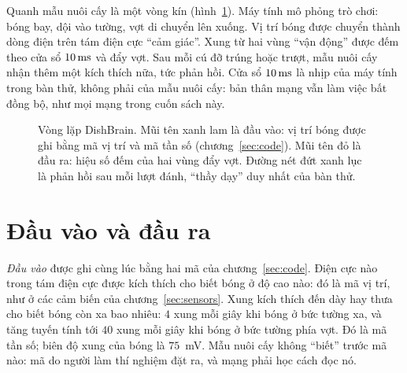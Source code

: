 Quanh mẫu nuôi cấy là một vòng kín (hình~\ref{fig:dishloop}). Máy tính mô phỏng trò chơi: bóng bay, dội vào tường, vợt di chuyển lên xuống. Vị trí bóng được chuyển thành dòng điện trên tám điện cực ``cảm giác''. Xung từ hai vùng ``vận động'' được đếm theo cửa sổ $10\,\text{ms}$ và đẩy vợt. Sau mỗi cú đỡ trúng hoặc trượt, mẫu nuôi cấy nhận thêm một kích thích nữa, tức phản hồi. Cửa sổ $10\,\text{ms}$ là nhịp của máy tính trong bàn thử, không phải của mẫu nuôi cấy: bản thân mạng vẫn làm việc bất đồng bộ, như mọi mạng trong cuốn sách này.

\begin{figure}[t]
\centering
{}
\caption{Vòng lặp DishBrain. Mũi tên xanh lam là đầu vào: vị trí bóng được ghi bằng mã vị trí và mã tần số (chương~\ref{sec:code}). Mũi tên đỏ là đầu ra: hiệu số đếm của hai vùng đẩy vợt. Đường nét đứt xanh lục là phản hồi sau mỗi lượt đánh, ``thầy dạy'' duy nhất của bàn thử.}
\label{fig:dishloop}
\end{figure}

\section{Đầu vào và đầu ra}

\emph{Đầu vào} được ghi cùng lúc bằng hai mã của chương~\ref{sec:code}. Điện cực nào trong tám điện cực được kích thích cho biết bóng ở độ cao nào: đó là mã vị trí, như ở các cảm biến của chương~\ref{sec:sensors}. Xung kích thích đến dày hay thưa cho biết bóng còn xa bao nhiêu: $4$ xung mỗi giây khi bóng ở bức tường xa, và tăng tuyến tính tới $40$ xung mỗi giây khi bóng ở bức tường phía vợt. Đó là mã tần số; biên độ xung của bóng là $75$~mV. Mẫu nuôi cấy không ``biết'' trước mã nào: mã do người làm thí nghiệm đặt ra, và mạng phải học cách đọc nó.

